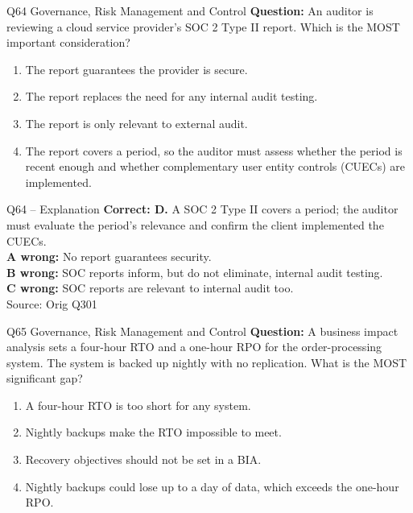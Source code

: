 \documentclass[aspectratio=169,10pt]{beamer}
\begin{document}
\begin{frame}[t]{Q64 \hfill {\scriptsize Governance, Risk Management and Control}}
	\small
	\textbf{Question:} An auditor is reviewing a cloud service provider's SOC 2 Type II report. Which is the MOST important consideration?
	\begin{enumerate}[label=\Alph*.,itemsep=1pt,topsep=3pt]
			\item The report guarantees the provider is secure.
			\item The report replaces the need for any internal audit testing.
			\item The report is only relevant to external audit.
			\item The report covers a period, so the auditor must assess whether the period is recent enough and whether complementary user entity controls (CUECs) are implemented.
	\end{enumerate}
\end{frame}

\begin{frame}[t]{Q64 -- Explanation}
	\footnotesize
	\textbf{Correct: D.} A SOC 2 Type II covers a period; the auditor must evaluate the period's relevance and confirm the client implemented the CUECs. \\[5pt]
\textbf{A wrong:} No report guarantees security. \\[3pt]
\textbf{B wrong:} SOC reports inform, but do not eliminate, internal audit testing. \\[3pt]
\textbf{C wrong:} SOC reports are relevant to internal audit too. \\[3pt]
	\vfill {\tiny Source: Orig Q301}
\end{frame}

\begin{frame}[t]{Q65 \hfill {\scriptsize Governance, Risk Management and Control}}
	\small
	\textbf{Question:} A business impact analysis sets a four-hour RTO and a one-hour RPO for the order-processing system. The system is backed up nightly with no replication. What is the MOST significant gap?
	\begin{enumerate}[label=\Alph*.,itemsep=1pt,topsep=3pt]
			\item A four-hour RTO is too short for any system.
			\item Nightly backups make the RTO impossible to meet.
			\item Recovery objectives should not be set in a BIA.
			\item Nightly backups could lose up to a day of data, which exceeds the one-hour RPO.
	\end{enumerate}
\end{frame}
\end{document}
